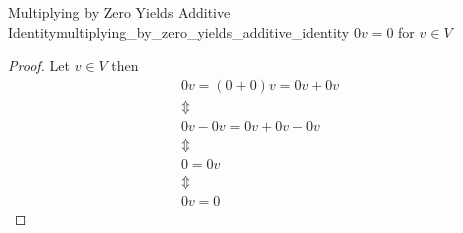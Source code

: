 \begin{proposition}{Multiplying by Zero Yields Additive
Identity}{multiplying_by_zero_yields_additive_identity}
\( 0 v =  0 \) for \( v \in  V \) 
\end{proposition}
\begin{proof}
    Let \( v \in  V \) then
    \begin{gather*}
        0 v =  \left( 0 +  0 \right) v =  0 v +  0 v \\
        \Updownarrow \\
        0 v -  0 v =  0 v +  0 v -  0v \\
        \Updownarrow \\
        0 =    0 v\\
        \Updownarrow \\
        0v =  0
    \end{gather*}
\end{proof}
